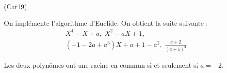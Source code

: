 \begin{tiny}(Car19)\end{tiny} On implémente l'algorithme d'Euclide. On obtient la suite suivante :
\begin{multline*}
 X^4 -X+a,\; X^2-aX+1,\;\\
(-1-2a+a^3)X+a+1-a^2,\; \frac{a+2}{(a+1)^2}
\end{multline*}

Les deux polynômes ont une racine en commun si et seulement si $a=-2$.
